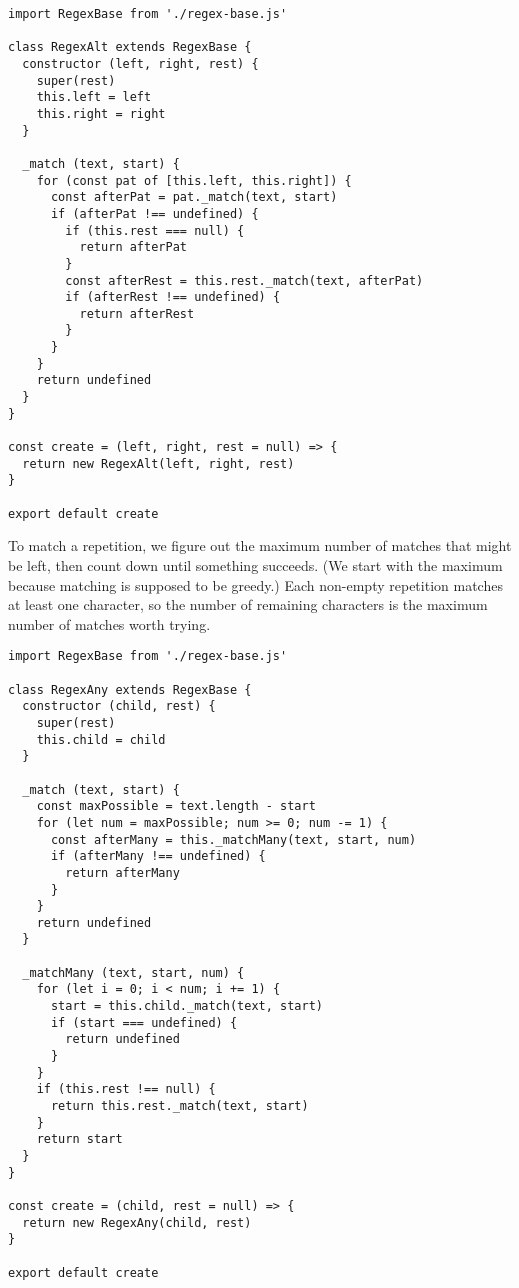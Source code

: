 \documentclass[krantzl]{krantz}
\begin{document}
\begin{lstlisting}[frame=tblr]
import RegexBase from './regex-base.js'

class RegexAlt extends RegexBase {
  constructor (left, right, rest) {
    super(rest)
    this.left = left
    this.right = right
  }

  _match (text, start) {
    for (const pat of [this.left, this.right]) {
      const afterPat = pat._match(text, start)
      if (afterPat !== undefined) {
        if (this.rest === null) {
          return afterPat
        }
        const afterRest = this.rest._match(text, afterPat)
        if (afterRest !== undefined) {
          return afterRest
        }
      }
    }
    return undefined
  }
}

const create = (left, right, rest = null) => {
  return new RegexAlt(left, right, rest)
}

export default create
\end{lstlisting}



To match a repetition,
we figure out the maximum number of matches that might be left,
then count down until something succeeds.
(We start with the maximum because matching is supposed to be greedy.)
Each non-empty repetition matches at least one character,
so the number of remaining characters is the maximum number of matches worth trying.


\begin{lstlisting}[frame=tblr]
import RegexBase from './regex-base.js'

class RegexAny extends RegexBase {
  constructor (child, rest) {
    super(rest)
    this.child = child
  }

  _match (text, start) {
    const maxPossible = text.length - start
    for (let num = maxPossible; num >= 0; num -= 1) {
      const afterMany = this._matchMany(text, start, num)
      if (afterMany !== undefined) {
        return afterMany
      }
    }
    return undefined
  }

  _matchMany (text, start, num) {
    for (let i = 0; i < num; i += 1) {
      start = this.child._match(text, start)
      if (start === undefined) {
        return undefined
      }
    }
    if (this.rest !== null) {
      return this.rest._match(text, start)
    }
    return start
  }
}

const create = (child, rest = null) => {
  return new RegexAny(child, rest)
}

export default create
\end{lstlisting}
\end{document}
